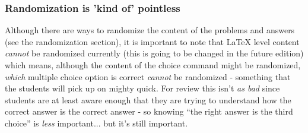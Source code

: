 \documentclass{ximera}
\begin{document}
        \subsubsection*{Randomization is 'kind of' pointless}
            Although there are ways to randomize the content of the problems and answers (see the randomization section), it is important to note that LaTeX level content \textit{cannot} be randomized currently (this is going to be changed in the future edition) which means, although the content of the choice command might be randomized, \textit{which} multiple choice option is correct \textit{cannot} be randomized - something that the students will pick up on mighty quick. For review this isn't \textit{as bad} since students are at least aware enough that they are trying to understand how the correct answer is the correct answer - so knowing ``the right answer is the third choice'' is \textit{less} important... but it's still important.
            
        
\end{document}
